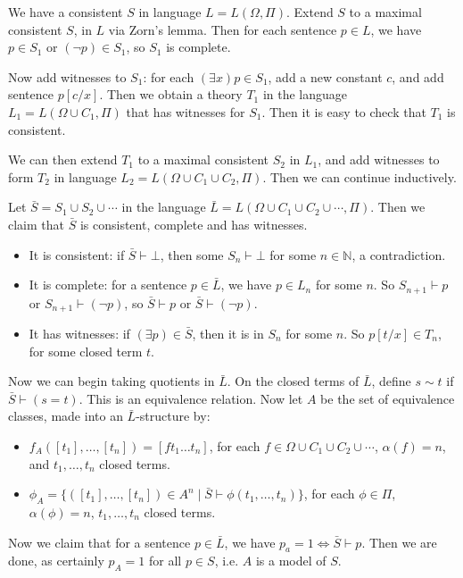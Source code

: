 \documentclass[12pt]{article}
\begin{document}
\begin{proofbox}
	We have a consistent $S$ in language $L = L(\Omega, \Pi)$. Extend $S$ to a maximal consistent $S$, in $L$ via Zorn's lemma. Then for each sentence $p \in L$, we have $p \in S_1$ or $(\neg p) \in S_1$, so $S_1$ is complete.

	Now add witnesses to $S_1$: for each $(\exists x)p \in S_1$, add a new constant $c$, and add sentence $p[c/x]$. Then we obtain a theory $T_1$ in the language $L_1 = L(\Omega \cup C_1, \Pi)$ that has witnesses for $S_1$. Then it is easy to check that $T_1$ is consistent.

	We can then extend $T_1$ to a maximal consistent $S_2$ in $L_1$, and add witnesses to form $T_2$ in language $L_2 = L(\Omega \cup C_1 \cup C_2, \Pi)$. Then we can continue inductively.

	Let $\bar S = S_1 \cup S_2 \cup \cdots$ in the language $\bar L = L(\Omega \cup C_1 \cup C_2 \cup \cdots, \Pi)$. Then we claim that $\bar S$ is consistent, complete and has witnesses.

	\begin{itemize}
		\item It is consistent: if $\bar S \vdash \bot$, then some $S_n \vdash \bot$ for some $n \in \mathbb{N}$, a contradiction.
		\item It is complete: for a sentence $p \in \bar L$, we have $p \in L_n$ for some $n$. So $S_{n+1} \vdash p$ or $S_{n+1} \vdash (\neg p)$, so $\bar S \vdash p$ or $\bar S \vdash (\neg p)$.
		\item It has witnesses: if $(\exists p) \in \bar S$, then it is in $S_n$ for some $n$. So $p[t/x] \in T_n$, for some closed term $t$.
	\end{itemize}

	Now we can begin taking quotients in $\bar L$. On the closed terms of $\bar L$, define $s \sim t$ if $\bar S \vdash (s = t)$. This is an equivalence relation. Now let $A$ be the set of equivalence classes, made into an $\bar L$-structure by:
	\begin{itemize}
		\item $f_A([t_1], \ldots, [t_n]) = [ft_1\ldots t_n]$, for each $f \in \Omega \cup C_1 \cup C_2 \cup \cdots$, $\alpha(f) = n$, and $t_1, \ldots, t_n$ closed terms.
		\item $\phi_A = \{([t_1], \ldots, [t_n]) \in A^{n} \mid \bar S \vdash \phi(t_1, \ldots, t_n)\}$, for each $\phi \in \Pi$, $\alpha(\phi) = n$, $t_1, \ldots, t_n$ closed terms.
	\end{itemize}
	Now we claim that for a sentence $p \in \bar L$, we have $p_a = 1 \iff \bar S \vdash p$. Then we are done, as certainly $p_A = 1$ for all $p \in S$, i.e. $A$ is a model of $S$.


\end{proofbox}
\end{document}
